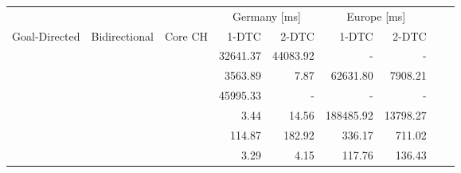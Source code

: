 \begin{tabular}{cccrrrrrr}
	\toprule
	              &               &         & \multicolumn{2}{c}{Germany [\si{\milli\second}]} & \multicolumn{2}{c}{Europe [\si{\milli\second}]}                 \\
	Goal-Directed & Bidirectional & Core CH & 1-DTC                                            & 2-DTC                                           & 1-DTC & 2-DTC \\
	\midrule
	\xmark        & \xmark        & \xmark  & 32641.37                                                & 44083.92                                               & -     & -     \\
	\cmark        & \xmark        & \xmark  & 3563.89                                                & 7.87                                               & 62631.80     & 7908.21     \\
	\xmark        & \cmark        & \xmark  & 45995.33                                                & -                                               & -     & -     \\
	\cmark        & \cmark        & \xmark  & 3.44                                                & 14.56                                               & 188485.92     & 13798.27     \\
	\xmark        & \cmark        & \cmark  & 114.87                                                & 182.92                                               & 336.17     & 711.02     \\
	\cmark        & \cmark        & \cmark  & 3.29                                                & 4.15                                               & 117.76     & 136.43     \\
	\bottomrule
\end{tabular}